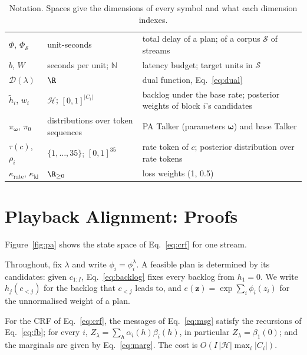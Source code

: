 \begin{table}[t]
\begin{tabular}{@{}l>{\raggedright\arraybackslash}p{4.2cm}>{\raggedright\arraybackslash}p{8.9cm}@{}}
$\Phi$, $\Phi_\mathcal{S}$ & unit-seconds & total delay of a plan; of a corpus $\mathcal{S}$ of streams \\
$b$, $W$ & seconds per unit; $\mathbb{N}$ & latency budget; target units in $\mathcal{S}$ \\
$\mathcal{D}(\lambda)$ & $\R$ & dual function, Eq.~\eqref{eq:dual} \\
$\tilde{h}_i$, $w_i$ & $\mathcal{H}$; $[0,1]^{|C_i|}$ & backlog under the base rate; posterior weights of block $i$'s candidates \\
$\pi_{\bm{\omega}}$, $\pi_0$ & distributions over token sequences & PA Talker (parameters $\bm{\omega}$) and base Talker \\
$\tau(c)$, $\rho_i$ & $\{1,\dots,35\}$; $[0,1]^{35}$ & rate token of $c$; posterior distribution over rate tokens \\
$\kappa_\text{rate}$, $\kappa_\text{kl}$ & $\R_{\ge0}$ & loss weights (1, 0.5) \\
\bottomrule
\end{tabular}
\caption{Notation. Spaces give the dimensions of every symbol and what each dimension indexes.}
\label{tab:notation}
\end{table}


\section{Playback Alignment: Proofs}
\label{app:proofs}



Figure~\ref{fig:pa} shows the state space of Eq.~\eqref{eq:crf} for one stream.

Throughout, fix $\lambda$ and write $\phi_i=\phi^\lambda_i$. A feasible plan is determined by its candidates: given
$c_{1:I}$, Eq.~\eqref{eq:backlog} fixes every backlog from $h_1=0$. We write $h_j(c_{<j})$ for the backlog that
$c_{<j}$ leads to, and $e(\bm{z})=\exp\sum_i\phi_i(z_i)$ for the unnormalised weight of a plan.

\begin{proposition}
\label{prop:fb}
For the CRF of Eq.~\eqref{eq:crf}, the messages of Eq.~\eqref{eq:msg} satisfy the recursions of Eq.~\eqref{eq:fb};
for every $i$, $Z_\lambda=\sum_h\alpha_i(h)\beta_i(h)$, in particular $Z_\lambda=\beta_1(0)$; and the marginals are given
by Eq.~\eqref{eq:marg}. The cost is $O(I\,|\mathcal{H}|\max_i|C_i|)$.
\end{proposition}

